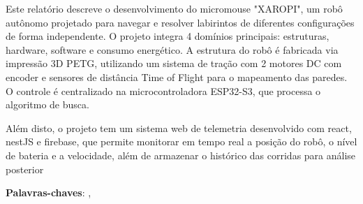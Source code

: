 \begin{resumo}
    
    Este relatório descreve o desenvolvimento do micromouse "XAROPI", um robô autônomo projetado para navegar e resolver labirintos de diferentes configurações de forma independente. O projeto integra 4 domínios principais: estruturas, hardware, software e consumo energético. A estrutura do robô é fabricada via impressão 3D PETG, utilizando um sistema de tração com 2 motores DC com encoder e sensores de distância Time of Flight para o mapeamento das paredes. O controle é centralizado na microcontroladora ESP32-S3, que processa o algoritmo de busca. 
    
    Além disto, o projeto tem um sistema web de telemetria desenvolvido com react, nestJS e firebase, que permite monitorar em tempo real a posição do robô, o nível de bateria e a velocidade, além de armazenar o histórico das corridas para análise posterior
    
\vspace{\onelineskip}
\noindent
\textbf{Palavras-chaves}: \imprimirpalavrachaveum, \imprimirpalavrachavedois
\end{resumo}




